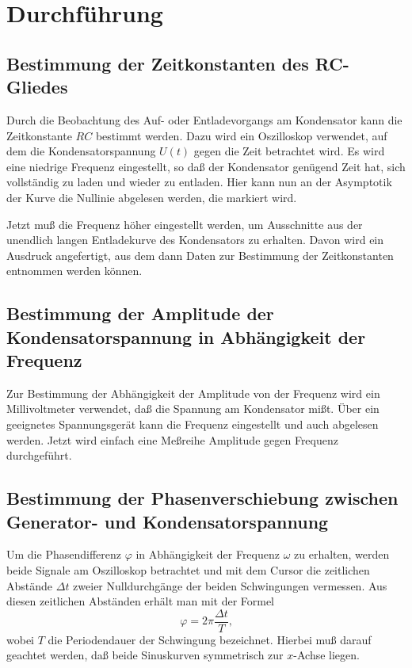 
\section{Durchführung}

\subsection{Bestimmung der Zeitkonstanten des RC-Gliedes}
Durch die Beobachtung des Auf- oder Entladevorgangs am Kondensator kann
die Zeitkonstante $RC$ bestimmt werden. Dazu wird ein Oszilloskop
verwendet, auf dem die Kondensatorspannung $U(t)$ gegen die Zeit
betrachtet wird. Es wird eine niedrige Frequenz eingestellt, so daß der
Kondensator genügend Zeit hat, sich vollständig zu laden und wieder zu
entladen. Hier kann nun an der Asymptotik der Kurve die Nullinie
abgelesen werden, die markiert wird.

Jetzt muß die Frequenz höher eingestellt werden, um Ausschnitte aus der
unendlich langen Entladekurve des Kondensators zu erhalten. Davon wird
ein Ausdruck angefertigt, aus dem dann Daten zur Bestimmung der
Zeitkonstanten entnommen werden können.

\subsection{Bestimmung der Amplitude der Kondensatorspannung in
  Abhängigkeit der Frequenz}

Zur Bestimmung der Abhängigkeit der Amplitude von der Frequenz wird ein
Millivoltmeter verwendet, daß die Spannung am Kondensator mißt. Über
ein geeignetes Spannungsgerät kann die Frequenz eingestellt und auch
abgelesen werden. Jetzt wird einfach eine Meßreihe Amplitude gegen
Frequenz durchgeführt.

\subsection{Bestimmung der Phasenverschiebung zwischen Generator- und
  Kondensatorspannung}

Um die Phasendifferenz $\varphi$ in Abhängigkeit der Frequenz $\omega$
zu erhalten, werden beide Signale am Oszilloskop betrachtet und mit dem
Cursor die zeitlichen Abstände $\Delta t$ zweier Nulldurchgänge der
beiden Schwingungen vermessen. Aus diesen zeitlichen Abständen erhält
man mit der Formel
%
\begin{equation}
  \label{eq:phase-zeitabstand}
  \varphi = 2\pi\frac{\Delta t}{T} \text{,}
\end{equation}
%
wobei $T$ die Periodendauer der Schwingung bezeichnet. Hierbei muß
darauf geachtet werden, daß beide Sinuskurven symmetrisch zur $x$-Achse
liegen.

